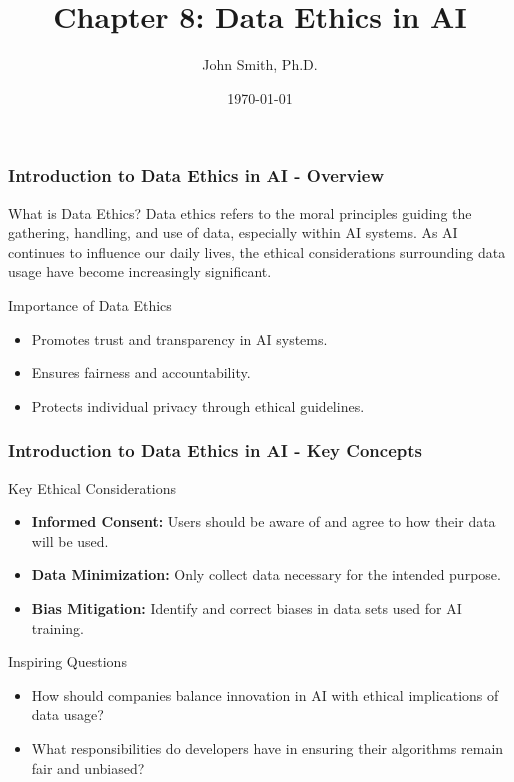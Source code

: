 \documentclass[aspectratio=169]{beamer}
\title[Data Ethics in AI]{Chapter 8: Data Ethics in AI}
\author[J. Smith]{John Smith, Ph.D.}
\institute[University Name]{
  Department of Computer Science\\
  University Name\\
  \vspace{0.3cm}
  Email: email@university.edu\\
  Website: www.university.edu
}
\date{\today}
\begin{document}
\frame{\titlepage}

\begin{frame}[fragile]
    \frametitle{Introduction to Data Ethics in AI - Overview}
    \begin{block}{What is Data Ethics?}
        Data ethics refers to the moral principles guiding the gathering, handling, and use of data, especially within AI systems. 
        As AI continues to influence our daily lives, the ethical considerations surrounding data usage have become increasingly significant.
    \end{block}
    
    \begin{block}{Importance of Data Ethics}
        \begin{itemize}
            \item Promotes trust and transparency in AI systems.
            \item Ensures fairness and accountability.
            \item Protects individual privacy through ethical guidelines.
        \end{itemize}
    \end{block}
\end{frame}

\begin{frame}[fragile]
    \frametitle{Introduction to Data Ethics in AI - Key Concepts}
    \begin{block}{Key Ethical Considerations}
        \begin{itemize}
            \item \textbf{Informed Consent:} Users should be aware of and agree to how their data will be used.
            \item \textbf{Data Minimization:} Only collect data necessary for the intended purpose.
            \item \textbf{Bias Mitigation:} Identify and correct biases in data sets used for AI training.
        \end{itemize}
    \end{block}

    \begin{block}{Inspiring Questions}
        \begin{itemize}
            \item How should companies balance innovation in AI with ethical implications of data usage?
            \item What responsibilities do developers have in ensuring their algorithms remain fair and unbiased?
        \end{itemize}
    \end{block}
\end{frame}
\end{document}
